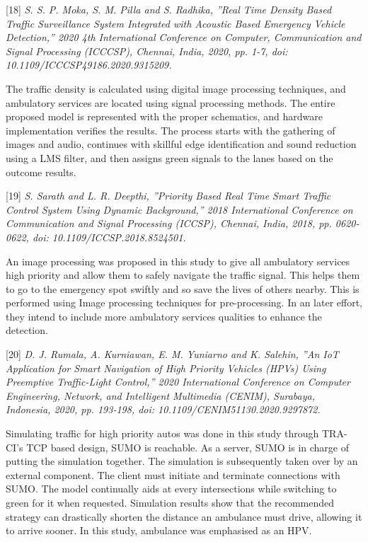 \documentclass[conference]{IEEEtran}
\begin{document}
[18]\emph{ S. S. P. Moka, S. M. Pilla and S. Radhika, ”Real
Time Density Based Traffic Surveillance System Integrated
with Acoustic Based Emergency Vehicle Detection,” 2020 4th
International Conference on Computer, Communication and Signal Processing (ICCCSP), Chennai, India, 2020, pp. 1-7,
doi: 10.1109/ICCCSP49186.2020.9315209. }

The traffic density is calculated using digital image processing techniques, and ambulatory services are located using signal processing methods. The entire proposed model is represented with the proper schematics, and hardware implementation verifies the results. The process starts with the gathering of images and audio, continues with skillful edge identification and sound reduction using a LMS filter, and then assigns green signals to the lanes based on the outcome results.

[19]\emph{ S. Sarath and L. R. Deepthi, ”Priority Based Real Time
Smart Traffic Control System Using Dynamic Background,”
2018 International Conference on Communication and Signal
Processing (ICCSP), Chennai, India, 2018, pp. 0620-0622,
doi: 10.1109/ICCSP.2018.8524501. } 

An image processing was proposed in this study to give all ambulatory services high priority and allow them to safely navigate the traffic signal. This helps them to go to the emergency spot swiftly and so save the lives of others nearby. This is performed using Image processing techniques for pre-processing. In an later effort, they intend to include more ambulatory services qualities to enhance the detection.

[20] \emph{ D. J. Rumala, A. Kurniawan, E. M. Yuniarno
and K. Salehin, ”An IoT Application for Smart Navigation of High Priority Vehicles (HPVs) Using Preemptive
Traffic-Light Control,” 2020 International Conference on
Computer Engineering, Network, and Intelligent Multimedia (CENIM), Surabaya, Indonesia, 2020, pp. 193-198, doi:
10.1109/CENIM51130.2020.9297872. }

Simulating traffic for high priority autos was done in this study through TRA-CI's TCP based design, SUMO is reachable. As a server, SUMO is in charge of putting the simulation together. The simulation is subsequently taken over by an external component. The client must initiate and terminate connections with SUMO. The model continually aids at every intersections while switching to green for it when requested. Simulation results show that the recommended strategy can drastically shorten the distance an ambulance must drive, allowing it to arrive sooner. In this study, ambulance was emphasised as an HPV.
\end{document}
